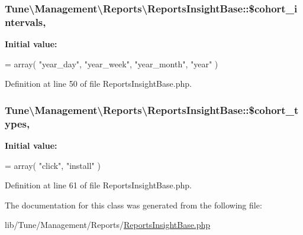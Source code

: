 \hypertarget{classTune_1_1Management_1_1Reports_1_1ReportsInsightBase_a4b54d97ffa0b522f9ab30425fc595ba7}{
\subsubsection[{\$cohort\-\_\-intervals}]{\setlength{\rightskip}{0pt plus 5cm}Tune\textbackslash{}\-Management\textbackslash{}\-Reports\textbackslash{}\-Reports\-Insight\-Base\-::\$cohort\-\_\-intervals\hspace{0.3cm}{\ttfamily [static]}, {\ttfamily [protected]}}}\label{classTune_1_1Management_1_1Reports_1_1ReportsInsightBase_a4b54d97ffa0b522f9ab30425fc595ba7}
{\bfseries Initial value\-:}
\begin{DoxyCode}
= array(
            \textcolor{stringliteral}{"year\_day"},
            \textcolor{stringliteral}{"year\_week"},
            \textcolor{stringliteral}{"year\_month"},
            \textcolor{stringliteral}{"year"}
        )
\end{DoxyCode}


Definition at line 50 of file Reports\-Insight\-Base.\-php.

\hypertarget{classTune_1_1Management_1_1Reports_1_1ReportsInsightBase_a1d7559051fef0f083d7d33ae18aaa6d6}{
\subsubsection[{\$cohort\-\_\-types}]{\setlength{\rightskip}{0pt plus 5cm}Tune\textbackslash{}\-Management\textbackslash{}\-Reports\textbackslash{}\-Reports\-Insight\-Base\-::\$cohort\-\_\-types\hspace{0.3cm}{\ttfamily [static]}, {\ttfamily [protected]}}}\label{classTune_1_1Management_1_1Reports_1_1ReportsInsightBase_a1d7559051fef0f083d7d33ae18aaa6d6}
{\bfseries Initial value\-:}
\begin{DoxyCode}
= array(
            \textcolor{stringliteral}{"click"},
            \textcolor{stringliteral}{"install"}
        )
\end{DoxyCode}


Definition at line 61 of file Reports\-Insight\-Base.\-php.



The documentation for this class was generated from the following file\-:\begin{DoxyCompactItemize}
\item 
lib/\-Tune/\-Management/\-Reports/\hyperlink{ReportsInsightBase_8php}{Reports\-Insight\-Base.\-php}\end{DoxyCompactItemize}
